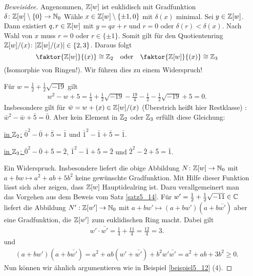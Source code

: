 \begin{beispiel}
\begin{enumerate}[label=(\arabic*)]
\begin{proof}[Beweisidee]
			Angenommen, $\mathbb{Z}[w]$ ist euklidisch mit Gradfunktion $\delta \colon \mathbb{Z}[w] \setminus \{0\} \to \mathbb{N}_0$ Wähle $x \in \mathbb{Z}[w] \setminus \{\pm 1, 0\}$ mit $\delta(x)$ minimal. Sei $y \in \mathbb{Z}[w]$. Dann existiert $q,r \in \mathbb{Z}[w]$ mit $y = q x + r$ und $r = 0$ oder $\delta(r) < \delta(x)$. Nach Wahl von $x$ muss $r=0$ oder $r \in \{\pm 1\}$. Somit gilt für den Quotientenring $\mathbb{Z}[w] / (x)$: $|\mathbb{Z}[w] / (x)| \in \{2,3\}$. Daraus folgt
			\[\faktor{\Z[w]}{(x)} \cong \Z_2\quad\text{oder}\quad \faktor{\Z[w]}{(x)} \cong \Z_3\]
			(Isomorphie von Ringen!). Wir führen dies zu einem Widerspruch!
			
			Für $w = \frac{1}{2} + \frac{1}{2}\sqrt{-19}$ gilt
			\begin{align*}
				w^2 - w + 5 = \frac{1}{4} + \frac{1}{2}\sqrt{-19} - \frac{19}{4} - \frac{1}{2} - \frac{1}{2}\sqrt{-19} + 5 = 0.
			\end{align*}
			Insbesondere gilt für $\bar{w} = w + (x) \in \mathbb{Z}[w] /(x)$ (Überstrich heißt hier Restklasse) : $\bar{w}^2 - \bar{w} + \bar{5} = \bar{0}$. Aber kein Element in $\mathbb{Z}_2$ oder $\mathbb{Z}_3$ erfüllt diese Gleichung:
			
			\underline{in $\mathbb{Z}_2$:} $\bar{0}^2 - \bar{0} + \bar{5} =  \bar{1}$ und $\bar{1}^2 - \bar{1} + \bar{5} = \bar{1}$.
			
			\underline{in $\mathbb{Z}_3$: } $\bar{0}^2 - \bar{0} + \bar{5} = \bar{2}$, $\bar{1}^2 - \bar{1} + \bar{5} = \bar{2}$ und $\bar{2}^2 - \bar{2} + \bar{5} = \bar{1}$.
			
			Ein Widerspruch. Insbesondere liefert die obige Abbildung $N \colon \mathbb{Z}[w] \to \mathbb{N}_0$ mit $a + bw \mapsto a^2 + ab + 5b^2$ keine gewünschte Gradfunktion. Mit Hilfe dieser Funktion lässt sich aber zeigen, dass $\mathbb{Z}[w]$ Hauptidealring ist. Dazu verallgemeinert man das Vorgehen aus dem Beweis vom Satz \ref{satz5_14}. Für $w' = \frac{1}{2} + \frac{1}{2}\sqrt{-11} \in \mathbb{C}$ liefert die Abbildung $N' : \mathbb{Z}[w'] \to \mathbb{N}_0$ mit $a + bw' \mapsto (a+bw')(a+b\bar{w'})$ aber eine Gradfunktion, die $\mathbb{Z}[w']$ zum euklidischen Ring macht. Dabei gilt
			\begin{align*}
				w' \cdot \bar{w'} = \frac{1}{4} + \frac{11}{4} = \frac{12}{4} = 3.
			\end{align*}
			und 
			\begin{align*}
				(a + bw')(a+b\bar{w'}) = a^2 + ab(w' + \bar{w'}) + b^2 w' \bar{w'} = a^2 + ab + 3b^2 \geq 0.
			\end{align*}
			Nun können wir ähnlich argumentieren wie in Beispiel \ref{beispiel5_12} (4).
		\end{proof}
	\end{enumerate}
\end{beispiel}





